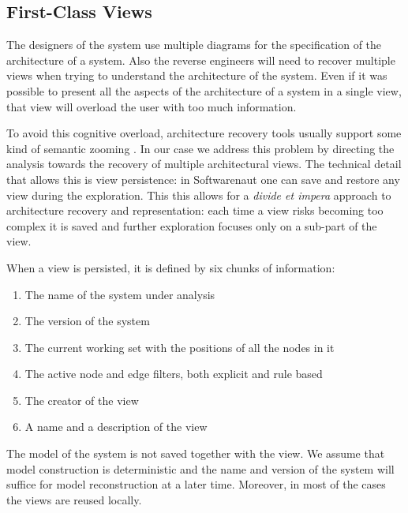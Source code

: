 \documentclass[preprint,12pt]{elsarticle}
\begin{document}
\newpage
\subsection {First-Class Views}

The designers of the system use multiple diagrams for the specification of the architecture of a system. Also the reverse engineers will need to recover multiple views when trying to understand the architecture of the system. Even if it was possible to present all the aspects of the architecture of a system in a single view, that view will overload the user with too much information.

To avoid this cognitive overload, architecture recovery tools usually support some kind of semantic zooming \cite{storey-shrimp}. In our case we address this problem by directing the analysis towards the recovery of multiple architectural views. The technical detail that allows this is view persistence: in Softwarenaut one can save and restore any view during the exploration. This this allows for a {\em divide et impera} approach to architecture recovery and representation: each time a view risks becoming too complex it is saved and further exploration focuses only on a sub-part of the view. 

When a view is persisted, it is defined by six chunks of information:

\begin{enumerate}
\item The name of the system under analysis
\item The version of the system 
\item The current working set with the positions of all the nodes in it
\item The active node and edge filters, both explicit and rule based
\item The creator of the view
\item A name and a description of the view
\end{enumerate}

The model of the system is not saved together with the view. We assume that model construction is deterministic and the name and version of the system will suffice for model reconstruction at a later time. Moreover, in most of the cases the views are reused locally.


\end{document}
